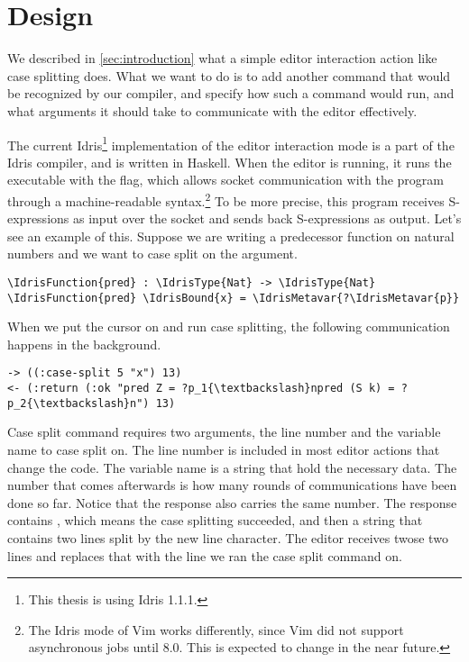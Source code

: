 \section{Design}\label{sec:design}

We described in \autoref{sec:introduction} what a simple editor interaction
action like case splitting does.  What we want to do is to add another command
that would be recognized by our compiler, and specify how such a command would
run, and what arguments it should take to communicate with the editor
effectively.

The current Idris\footnote{This thesis is using Idris 1.1.1.} implementation of
the editor interaction mode is a part of the Idris compiler, and is written in
Haskell. When the editor is running,
it runs the  executable with the  flag, which
allows socket communication with the program through a machine-readable
syntax.\footnote{The Idris mode of Vim works differently, since Vim did not
support asynchronous jobs until 8.0. This is expected to change in the near
future.}
To be more precise, this program receives S-expressions\cite{mccarthy} as input
over the socket and sends back S-expressions as output. Let's see an example of
this. Suppose we are writing a predecessor function on natural numbers and we
want to case split on the argument.

\begin{Verbatim}
\IdrisFunction{pred} : \IdrisType{Nat} -> \IdrisType{Nat}
\IdrisFunction{pred} \IdrisBound{x} = \IdrisMetavar{?\IdrisMetavar{p}}
\end{Verbatim}

When we put the cursor on  and run case splitting, the following
communication happens in the background.

\begin{Verbatim}
-> ((:case-split 5 "x") 13)
<- (:return (:ok "pred Z = ?p_1{\textbackslash}npred (S k) = ?p_2{\textbackslash}n") 13)
\end{Verbatim}

Case split command requires two arguments, the line number and the variable
name to case split on. The line number is included in most editor actions that
change the code. The variable name is a string that hold the necessary data.
The number  that comes afterwards is how many rounds of communications
have been done so far. Notice that the response also carries the same number.
The response contains , which means the case splitting succeeded,
and then a string that contains two lines split by the new line character.
The editor receives twose two lines and replaces that with the line we ran the
case split command on.

